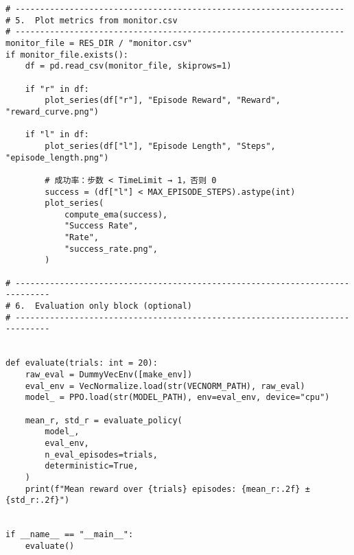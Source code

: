 \begin{verbatim}
# -------------------------------------------------------------------
# 5.  Plot metrics from monitor.csv
# -------------------------------------------------------------------
monitor_file = RES_DIR / "monitor.csv"
if monitor_file.exists():
    df = pd.read_csv(monitor_file, skiprows=1)

    if "r" in df:
        plot_series(df["r"], "Episode Reward", "Reward", "reward_curve.png")

    if "l" in df:
        plot_series(df["l"], "Episode Length", "Steps", "episode_length.png")

        # 成功率：步数 < TimeLimit → 1，否则 0
        success = (df["l"] < MAX_EPISODE_STEPS).astype(int)
        plot_series(
            compute_ema(success),
            "Success Rate",
            "Rate",
            "success_rate.png",
        )

# -----------------------------------------------------------------------------
# 6.  Evaluation only block (optional)
# -----------------------------------------------------------------------------


def evaluate(trials: int = 20):
    raw_eval = DummyVecEnv([make_env])
    eval_env = VecNormalize.load(str(VECNORM_PATH), raw_eval)
    model_ = PPO.load(str(MODEL_PATH), env=eval_env, device="cpu")

    mean_r, std_r = evaluate_policy(
        model_,
        eval_env,
        n_eval_episodes=trials,
        deterministic=True,
    )
    print(f"Mean reward over {trials} episodes: {mean_r:.2f} ± {std_r:.2f}")


if __name__ == "__main__":
    evaluate()

\end{verbatim}